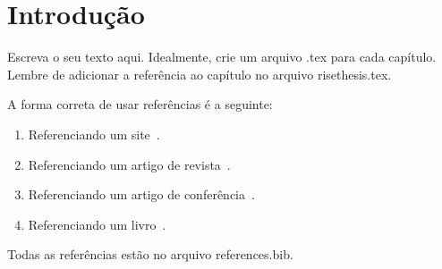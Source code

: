 \chapter{Introdução}
\label{ch:introducao}

Escreva o seu texto aqui. Idealmente, crie um arquivo .tex para cada capítulo. Lembre de adicionar a referência ao capítulo no arquivo risethesis.tex. 

A forma correta de usar referências é a seguinte:

\begin{enumerate}
    \item Referenciando um site~\cite{exemplo-site}.
    \item Referenciando um artigo de revista~\cite{exemplo-revista}.
    \item Referenciando um artigo de conferência~\cite{exemplo-conferencia}.
    \item Referenciando um livro~\cite{exemplo-livro}.
\end{enumerate}

Todas as referências estão no arquivo references.bib.